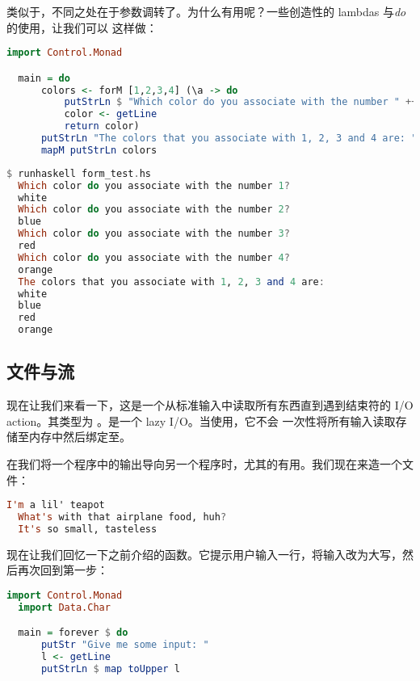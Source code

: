 \documentclass[./main.tex]{subfiles}
\begin{document}
类似于，不同之处在于参数调转了。为什么有用呢？一些创造性的 lambdas 与\textit{do}的使用，让我们可以
这样做：

\begin{lstlisting}[language=Haskell]
  import Control.Monad

  main = do
      colors <- forM [1,2,3,4] (\a -> do
          putStrLn $ "Which color do you associate with the number " ++ show a ++ "?"
          color <- getLine
          return color)
      putStrLn "The colors that you associate with 1, 2, 3 and 4 are: "
      mapM putStrLn colors
\end{lstlisting}

\begin{lstlisting}[language=Haskell]
  $ runhaskell form_test.hs
  Which color do you associate with the number 1?
  white
  Which color do you associate with the number 2?
  blue
  Which color do you associate with the number 3?
  red
  Which color do you associate with the number 4?
  orange
  The colors that you associate with 1, 2, 3 and 4 are:
  white
  blue
  red
  orange
\end{lstlisting}

\subsection*{文件与流}

现在让我们来看一下，这是一个从标准输入中读取所有东西直到遇到结束符的 I/O action。其类型为
。是一个 lazy I/O。当使用，它不会
一次性将所有输入读取存储至内存中然后绑定至。

在我们将一个程序中的输出导向另一个程序时，尤其的有用。我们现在来造一个文件：

\begin{lstlisting}[language=Haskell]
  I'm a lil' teapot
  What's with that airplane food, huh?
  It's so small, tasteless
\end{lstlisting}

现在让我们回忆一下之前介绍的函数。它提示用户输入一行，将输入改为大写，然后再次回到第一步：

\begin{lstlisting}[language=Haskell]
  import Control.Monad
  import Data.Char

  main = forever $ do
      putStr "Give me some input: "
      l <- getLine
      putStrLn $ map toUpper l
\end{lstlisting}
\end{document}
